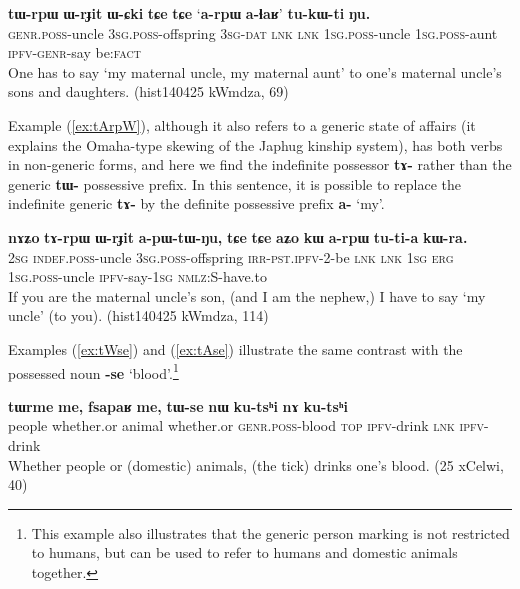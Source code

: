 \documentclass[oneside,a4paper,11pt]{article}
\newcommand{\ipa}[1]{\textbf{\phon\mbox{#1}}} %
\newcommand{\refb}[1]{(\ref{#1})}
\begin{document}
\begin{exe}
\ex \label{ex:tWrpW}
\gll
 \ipa{tɯ-rpɯ} 	\ipa{ɯ-rɟit} 	\ipa{ɯ-ɕki} 	\ipa{tɕe} 	\ipa{tɕe} 	`\ipa{a-rpɯ} \ipa{a-ɬaʁ}' 	\ipa{tu-kɯ-ti} 	\ipa{ŋu.} \\
\textsc{genr.poss}-uncle \textsc{3sg.poss}-offspring \textsc{3sg-dat} \textsc{lnk} \textsc{lnk} \textsc{1sg.poss}-uncle \textsc{1sg.poss}-aunt \textsc{ipfv-genr}-say be:\textsc{fact} \\
\glt One has to say `my maternal uncle, my maternal aunt' to one's maternal uncle's sons and daughters. (hist140425 kWmdza, 69)
\end{exe}

Example \refb{ex:tArpW}, although it also refers to a generic state of affairs (it explains the Omaha-type skewing of the Japhug kinship system), has both verbs in non-generic forms, and here we find the indefinite possessor \ipa{tɤ-} rather than the generic \ipa{tɯ-} possessive prefix. In this sentence, it is possible to replace the indefinite generic \ipa{tɤ-} by the definite possessive prefix \ipa{a-} `my'.

\begin{exe}
\ex  \label{ex:tArpW}
\gll
\ipa{nɤʑo} 	\ipa{tɤ-rpɯ} 	\ipa{ɯ-rɟit} 	\ipa{a-pɯ-tɯ-ŋu,} 	\ipa{tɕe} 	\ipa{tɕe} 	\ipa{aʑo} 	\ipa{kɯ} 	\ipa{a-rpɯ} 	\ipa{tu-ti-a} 	\ipa{kɯ-ra.}  \\
\textsc{2sg} \textsc{indef.poss}-uncle \textsc{3sg.poss}-offspring \textsc{irr-pst.ipfv}-2-be \textsc{lnk} \textsc{lnk} \textsc{1sg} \textsc{erg}  \textsc{1sg.poss}-uncle \textsc{ipfv}-say-\textsc{1sg} \textsc{nmlz:S}-have.to  \\
\glt If you are the maternal uncle's son, (and I am the nephew,) I have to say `my uncle' (to you).  (hist140425 kWmdza, 114)
\end{exe}

Examples \refb{ex:tWse} and \refb{ex:tAse} illustrate the same contrast with the possessed noun \ipa{-se} `blood'.\footnote{This example also illustrates that the generic person marking is not restricted to humans, but can be used to refer to humans and domestic animals together.  }

\begin{exe}
\ex  \label{ex:tWse}
\gll
\ipa{tɯrme} 	\ipa{me,} 	\ipa{fsapaʁ} 	\ipa{me,} 	\ipa{tɯ-se} 	\ipa{nɯ} 	\ipa{ku-tsʰi} 	\ipa{nɤ} 	\ipa{ku-tsʰi} \\
people whether.or animal whether.or \textsc{genr.poss}-blood \textsc{top} \textsc{ipfv}-drink \textsc{lnk} \textsc{ipfv}-drink \\
\glt Whether people or (domestic) animals, (the tick) drinks one's blood. (25 xCelwi, 40)
\end{exe}
\end{document}

